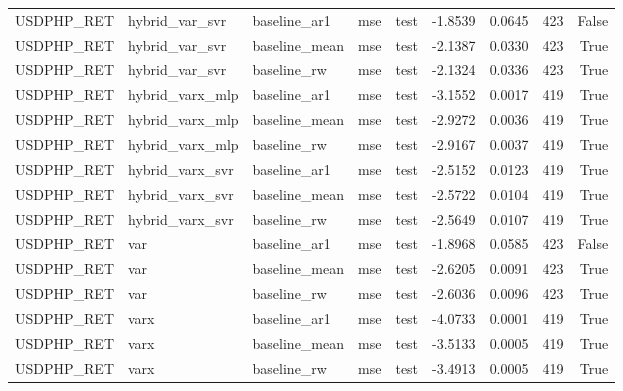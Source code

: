 \begin{tabular}{lllllrrrr}
USDPHP_RET & hybrid_var_svr & baseline_ar1 & mse & test & -1.8539 & 0.0645 & 423 & False \\
USDPHP_RET & hybrid_var_svr & baseline_mean & mse & test & -2.1387 & 0.0330 & 423 & True \\
USDPHP_RET & hybrid_var_svr & baseline_rw & mse & test & -2.1324 & 0.0336 & 423 & True \\
USDPHP_RET & hybrid_varx_mlp & baseline_ar1 & mse & test & -3.1552 & 0.0017 & 419 & True \\
USDPHP_RET & hybrid_varx_mlp & baseline_mean & mse & test & -2.9272 & 0.0036 & 419 & True \\
USDPHP_RET & hybrid_varx_mlp & baseline_rw & mse & test & -2.9167 & 0.0037 & 419 & True \\
USDPHP_RET & hybrid_varx_svr & baseline_ar1 & mse & test & -2.5152 & 0.0123 & 419 & True \\
USDPHP_RET & hybrid_varx_svr & baseline_mean & mse & test & -2.5722 & 0.0104 & 419 & True \\
USDPHP_RET & hybrid_varx_svr & baseline_rw & mse & test & -2.5649 & 0.0107 & 419 & True \\
USDPHP_RET & var & baseline_ar1 & mse & test & -1.8968 & 0.0585 & 423 & False \\
USDPHP_RET & var & baseline_mean & mse & test & -2.6205 & 0.0091 & 423 & True \\
USDPHP_RET & var & baseline_rw & mse & test & -2.6036 & 0.0096 & 423 & True \\
USDPHP_RET & varx & baseline_ar1 & mse & test & -4.0733 & 0.0001 & 419 & True \\
USDPHP_RET & varx & baseline_mean & mse & test & -3.5133 & 0.0005 & 419 & True \\
USDPHP_RET & varx & baseline_rw & mse & test & -3.4913 & 0.0005 & 419 & True \\
\bottomrule
\end{tabular}
